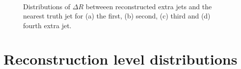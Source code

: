 \begin{figure}
\centering
{}
\\
\caption{Distributions of $\Delta R$ betweeen reconstructed extra jets and the nearest truth jet for (a) the first, (b) second, (c) third and (d) fourth extra jet. }
\label{fig:truthdr}
\end{figure}
\section{Reconstruction level distributions}

